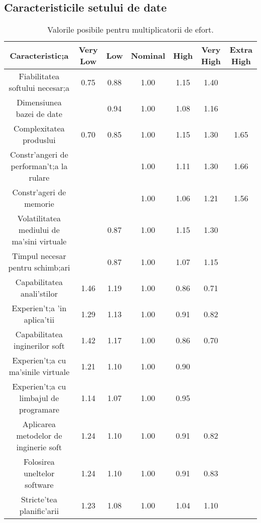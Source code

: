 \subsection{Caracteristicile setului de date}
\par
\begin{table}[!htbp]
\begin{center}
\begin{tabular}{| c | c | c | c | c | c | c |}
\hline
Caracteristic;a & Very Low & Low & Nominal & High & Very High & Extra High \\ \hline \hline
Fiabilitatea softului necesar;a & 0.75 & 0.88 & 1.00 & 1.15 & 1.40 & \\ \hline
Dimensiunea bazei de date &  & 0.94 & 1.00 & 1.08 & 1.16 & \\ \hline
Complexitatea produslui & 0.70 & 0.85 & 1.00 & 1.15 & 1.30 & 1.65 \\ \hline
Constr'angeri de performan't;a la rulare & & & 1.00 & 1.11 & 1.30 & 1.66 \\ \hline
Constr'ageri de memorie & & & 1.00 & 1.06 & 1.21 & 1.56 \\ \hline
Volatilitatea mediului de ma'sini virtuale & & 0.87 & 1.00 & 1.15 & 1.30 & \\ \hline
Timpul necesar pentru schimb;ari & & 0.87 & 1.00 & 1.07 & 1.15 & \\ \hline
Capabilitatea anali'stilor & 1.46 & 1.19 & 1.00 & 0.86 & 0.71 & \\ \hline
Experien't;a 'in aplica'tii & 1.29 & 1.13 & 1.00 & 0.91 & 0.82 & \\ \hline
Capabilitatea inginerilor soft & 1.42 & 1.17 & 1.00 & 0.86 & 0.70 & \\ \hline
Experien't;a cu ma'sinile virtuale & 1.21 & 1.10 & 1.00 & 0.90 & & \\ \hline
Experien't;a cu limbajul de programare & 1.14 & 1.07 & 1.00 & 0.95 & & \\ \hline
Aplicarea metodelor de inginerie soft & 1.24 & 1.10 & 1.00 & 0.91 & 0.82 & \\ \hline
Folosirea uneltelor software & 1.24 & 1.10 & 1.00 & 0.91 & 0.83 & \\ \hline
Stricte'tea planific'arii & 1.23 & 1.08 & 1.00 & 1.04 & 1.10 & \\ \hline
\end{tabular}
\caption{Valorile posibile pentru multiplicatorii de efort.}
\end{center}
\end{table}
\par
